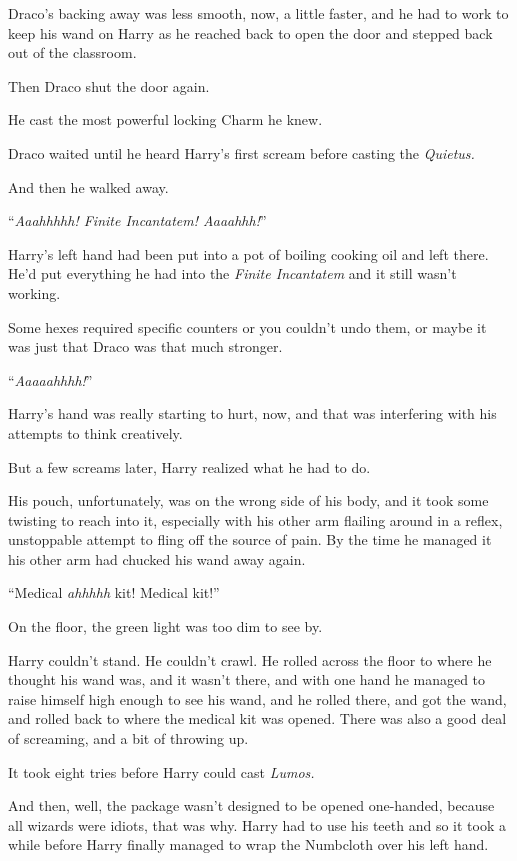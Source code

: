 Draco’s backing away was less smooth, now, a little faster, and he had to work
to keep his wand on Harry as he reached back to open the door and stepped back
out of the classroom.

Then Draco shut the door again.

He cast the most powerful locking Charm he knew.

Draco waited until he heard Harry’s first scream before casting the
\emph{Quietus.}

And then he walked away.

\later

“\emph{Aaahhhhh! Finite Incantatem! Aaaahhh!}”

Harry’s left hand had been put into a pot of boiling cooking oil and left
there. He’d put everything he had into the \emph{Finite Incantatem} and it
still wasn’t working.

Some hexes required specific counters or you couldn’t undo them, or maybe it
was just that Draco was that much stronger.

“\emph{Aaaaahhhh!}”

Harry’s hand was really starting to hurt, now, and that was interfering with
his attempts to think creatively.

But a few screams later, Harry realized what he had to do.

His pouch, unfortunately, was on the wrong side of his body, and it took some
twisting to reach into it, especially with his other arm flailing around in a
reflex, unstoppable attempt to fling off the source of pain. By the time he
managed it his other arm had chucked his wand away again.

“Medical \emph{ahhhhh} kit! Medical kit!”

On the floor, the green light was too dim to see by.

Harry couldn’t stand. He couldn’t crawl. He rolled across the floor to where he
thought his wand was, and it wasn’t there, and with one hand he managed to
raise himself high enough to see his wand, and he rolled there, and got the
wand, and rolled back to where the medical kit was opened. There was also a
good deal of screaming, and a bit of throwing up.

It took eight tries before Harry could cast \emph{Lumos.}

And then, well, the package wasn’t designed to be opened one-handed, because
all wizards were idiots, that was why. Harry had to use his teeth and so it
took a while before Harry finally managed to wrap the Numbcloth over his left
hand.

